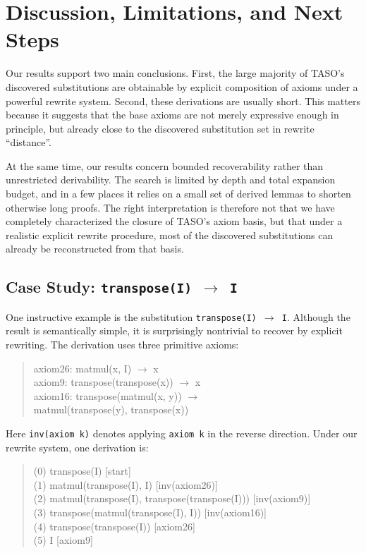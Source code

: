 \documentclass[sigplan,10pt,nonacm]{acmart}
\begin{document}
\section{Discussion, Limitations, and Next Steps}
\label{sec:discussion}

Our results support two main conclusions. First, the large majority of TASO's discovered substitutions are obtainable by explicit composition of axioms under a powerful rewrite system. Second, these derivations are usually short. This matters because it suggests that the base axioms are not merely expressive enough in principle, but already close to the discovered substitution set in rewrite ``distance''.

At the same time, our results concern bounded recoverability rather than unrestricted derivability. The search is limited by depth and total expansion budget, and in a few places it relies on a small set of derived lemmas to shorten otherwise long proofs. The right interpretation is therefore not that we have completely characterized the closure of TASO's axiom basis, but that under a realistic explicit rewrite procedure, most of the discovered substitutions can already be reconstructed from that basis.

\subsection{Case Study: \texttt{transpose(I) \(\to\) I}}

One instructive example is the substitution \texttt{transpose(I) \(\to\) I}. Although the result is semantically simple, it is surprisingly nontrivial to recover by explicit rewriting. The derivation uses three primitive axioms:

\begin{quote}
  \small\ttfamily
  axiom26: matmul(x, I) $\rightarrow$ x\\
  axiom9: transpose(transpose(x)) $\rightarrow$ x\\
  axiom16: transpose(matmul(x, y)) $\rightarrow$\\
  \hspace*{1.5em}matmul(transpose(y), transpose(x))
  \end{quote}

Here \texttt{inv(axiom k)} denotes applying \texttt{axiom k} in the reverse direction. Under our rewrite system, one derivation is:

\begin{quote}
\small\ttfamily
(0) transpose(I) [start]\\
(1) matmul(transpose(I), I) [inv(axiom26)]\\
(2) matmul(transpose(I), transpose(transpose(I))) [inv(axiom9)]\\
(3) transpose(matmul(transpose(I), I)) [inv(axiom16)]\\
(4) transpose(transpose(I)) [axiom26]\\
(5) I [axiom9]
\end{quote}
\end{document}

